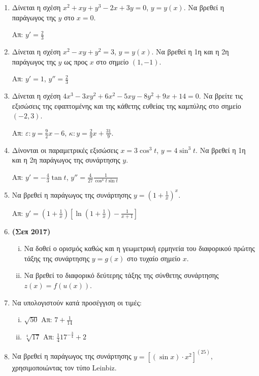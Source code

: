






\begin{center}
\end{center}

\vspace{\baselineskip}

\begin{enumerate}
	\item Δίνεται η σχέση $ x^{2} + xy + y^{3} -2x + 3y = 0 $, $ y=y(x) $. Να βρεθεί η
		παράγωγος της $y$ στο $ x=0 $. 

		\hfill Απ: $ y'= \frac{2}{3} $
	\item Δίνεται η σχέση $ x^{2} - xy + y^{2} = 3 $, $ y=y(x) $. Να βρεθεί η 1η
		και η 2η παράγωγος της $y$ ως προς $x$ στο σημείο $ (1,-1) $.

		\hfill Απ: $ y' = 1$, $ y'' = \frac{2}{3} $

	\item Δίνεται η σχέση $ 4x^{3} - 3xy^{2} + 6x^{2} - 5xy - 8 y^{2} + 9x + 14
		= 0$. Να βρείτε τις εξισώσεις της εφαπτομένης και της κάθετης ευθείας
		της καμπύλης στο σημείο $ (-2,3) $.

		\hfill Απ: $\varepsilon\colon y = \frac{9}{2} x - 6 $, $\kappa\colon y = \frac{2}{9} x +
		\frac{31}{9} $.

	\item Δίνονται οι παραμετρικές εξισώσεις $ x = 3 \cos^{3}{t} $, $ y = 4
		\sin^{3}{t}	$. Να βρεθεί η 1η και η 2η παράγωγος της συνάρτησης $y$.

		\hfill Απ: $ y' = -\frac{4}{3} \tan{t} $, $ y'' = \frac{4}{27}
		\frac{1}{\cos^{4}t \sin{t}} $ 

	\item Να βρεθεί η παράγωγος της συνάρτησης $ y = \left(1 +
		\frac{1}{x} \right)^{x} $.

		\hfill Απ: $ y' = \left(1 + \frac{1}{x}\right)\left[\ln(1 + \frac{1}{x}) -
		\frac{1}{x+1}\right] $
	\item {\bfseries (Σεπ 2017)}
		\begin{enumerate}[i)]
			\item Να δοθεί ο ορισμός καθώς και η γεωμετρική
				ερμηνεία του διαφορικού πρώτης τάξης της συνάρτησης $ y = g(x) $ στο
				τυχαίο σημείο $x$. 
			\item Να βρεθεί το διαφορικό δεύτερης τάξης της σύνθετης συνάρτησης $ z(x) =
				f(u(x))	$.
		\end{enumerate}
	\item Να υπολογιστούν κατά προσέγγιση οι τιμές:
		\begin{enumerate}[i)]
			\item $\sqrt{50}$ \hfill Απ: $7+\frac{1}{14}$
			\item $\sqrt[4]{17}$ \hfill Απ: $\frac{1}{4}17^{-\frac{3}{4}}+2$
		\end{enumerate}
	\item Να βρεθεί η παράγωγος της συνάρτησης $ y= \left[(\sin{x}) \cdot
		x^{2}\right]^{(25)}$, χρησιμοποιώντας τον τύπο \textlatin{Leinbiz}.


\end{enumerate}
